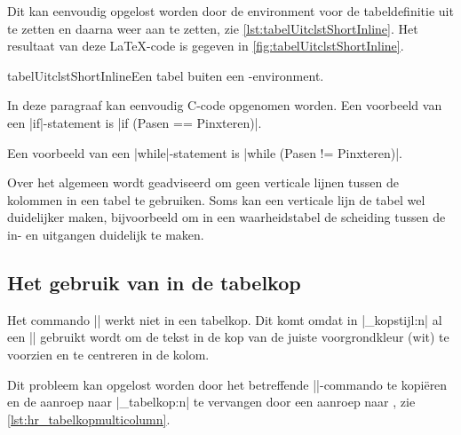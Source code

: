 \begin{llstShortInline}
	Dit kan eenvoudig opgelost worden door de environment voor de tabeldefinitie uit te zetten en daarna weer aan te zetten,
	zie \cref{lst:tabelUitclstShortInline}. Het resultaat van deze \LaTeX{}-code is gegeven in \cref{fig:tabelUitclstShortInline}.

\begin{floatlst}[style=lstyle]{tabelUitclstShortInline}{Een tabel buiten een -environment.}
\begin{clstShortInline}
	In deze paragraaf kan eenvoudig C-code opgenomen worden.
	Een voorbeeld van een |if|-statement is |if (Pasen == Pinxteren)|.
\end{clstShortInline}

\begin{clstShortInline}
	Een voorbeeld van een |while|-statement is |while (Pasen != Pinxteren)|.
\end{clstShortInline}
\end{floatlst}

	
	Over het algemeen wordt geadviseerd om geen verticale lijnen tussen de kolommen in een tabel te gebruiken.
	Soms kan een verticale lijn de tabel wel duidelijker maken, bijvoorbeeld om in een waarheidstabel de scheiding tussen de in- en uitgangen duidelijk te maken.

	\subsection{\texorpdfstring{Het gebruik van \lcode{\\multicolumn} in de tabelkop}{Het gebruik van \textbackslash{}multicolumn in de tabelkop}}
	Het commando |\multicolumn| werkt niet in een tabelkop. 
	Dit komt omdat in |\hr_kopstijl:n| al een |\multicolumn| gebruikt wordt om de tekst in de kop van de juiste voorgrondkleur (wit) te voorzien en te centreren in de kolom.
	
	Dit probleem kan opgelost worden door het betreffende |\tabel|-commando te kopiëren en de aanroep naar |\hr_tabelkop:n| te vervangen door een aanroep naar , zie \cref{lst:hr_tabelkopmulticolumn}.


\end{llstShortInline}
